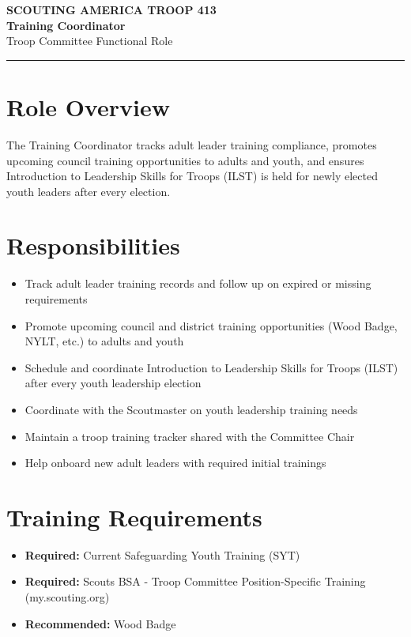 \documentclass[11pt, letterpaper]{article}
\begin{document}
\begin{center}
  {\small\color{scoutgreen}\textbf{SCOUTING AMERICA \textbullet{} TROOP 413}} \\[4pt]
  {\fontsize{20pt}{24pt}\selectfont\bfseries\color{scoutgreen} Training Coordinator} \\[4pt]
  {\large\color{accent} Troop Committee \textbullet{} Functional Role} \\[4pt]
  \textcolor{accent}{\rule{0.6\linewidth}{1pt}}
\end{center}

\vspace{0.3em}

\begin{minipage}[t]{0.48\linewidth}
\raggedright

\section{Role Overview}
The Training Coordinator tracks adult leader training compliance, promotes upcoming council training opportunities to adults and youth, and ensures Introduction to Leadership Skills for Troops (ILST) is held for newly elected youth leaders after every election.

\vspace{0.4em}
\section{Responsibilities}
\begin{itemize}
  \item Track adult leader training records and follow up on expired or missing requirements
  \item Promote upcoming council and district training opportunities (Wood Badge, NYLT, etc.) to adults and youth
  \item Schedule and coordinate Introduction to Leadership Skills for Troops (ILST) after every youth leadership election
  \item Coordinate with the Scoutmaster on youth leadership training needs
  \item Maintain a troop training tracker shared with the Committee Chair
  \item Help onboard new adult leaders with required initial trainings
\end{itemize}

\section{Training Requirements}
\begin{itemize}
  \item \textbf{Required:} Current Safeguarding Youth Training (SYT)
  \item \textbf{Required:} Scouts BSA - Troop Committee Position-Specific Training (my.scouting.org)
  \item \textbf{Recommended:} Wood Badge
\end{itemize}

\end{minipage}
\end{document}

